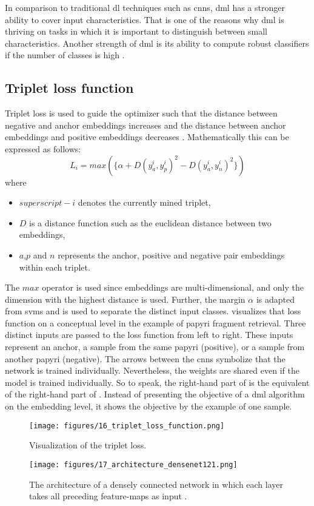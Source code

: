 \noindent In comparison to traditional \ac{dl} techniques such as \acp{cnn}, \ac{dml} has a stronger ability to cover input characteristics. That is one of the reasons why \ac{dml} is thriving on tasks in which it is important to distinguish between small characteristics. Another strength of \ac{dml} is its ability to compute robust classifiers if the number of classes is high \cite{Schroff15, Rippel16}. 

\subsection{Triplet loss function}
\label{subsec:tripletloss}
Triplet loss is used to guide the optimizer such that the distance between negative and anchor embeddings increases and the distance between anchor embeddings and positive embeddings decreases \cite{Schroff15}. Mathematically this can be expressed as follows: 
\begin{equation}
	\label{equ:pairs}
	L_i = max(\{\alpha + D(y_{a}^{i},y_{p}^{i})^2 - D(y_{a}^{i},y_{n}^{i})^2\})
\end{equation}
where
\begin{itemize}
	\item \(superscript-i\) denotes the currently mined triplet,
	\item \(D\) is a distance function such as the euclidean distance between two embeddings,
	\item \(a\),\(p\) and \(n\) represents the anchor, positive and negative pair embeddings within each triplet. 
\end{itemize}
The \(max\) operator is used since embeddings are multi-dimensional, and only the dimension with the highest distance is used. Further, the margin \(\alpha\) is adapted from \acp{svm} and is used to separate the distinct input classes.  visualizes that loss function on a conceptual level in the example of papyri fragment retrieval. Three distinct inputs are passed to the loss function from left to right. These inputs represent an anchor, a sample from the same papyri (positive), or a sample from another papyri (negative). The arrows between the \acp{cnn} symbolize that the network is trained individually. Nevertheless, the weights are shared even if the model is trained individually. So to speak, the right-hand part of  is the equivalent of the right-hand part of . Instead of presenting the objective of a \ac{dml} algorithm on the embedding level, it shows the objective by the example of one sample. 
%
\begin{figure}[t]
	\centering
	\texttt{[image: figures/16\_triplet\_loss\_function.png]}
	\caption{Visualization of the triplet loss.}
	\label{fig:loss}
\end{figure} 
%
%
\begin{figure}[t]
	\centering
	\texttt{[image: figures/17\_architecture\_densenet121.png]}
	\caption{The architecture of a densely connected network in which each layer takes all preceding feature-maps as input \cite{Huang17}.}
	\label{fig:dense}
\end{figure} 
%
